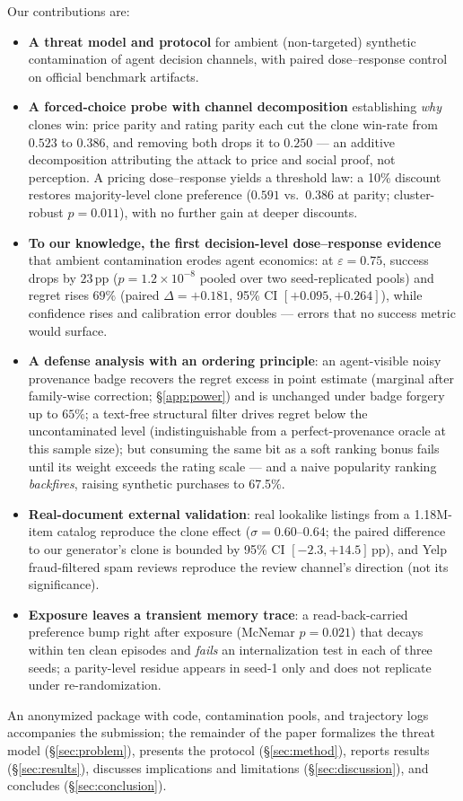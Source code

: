 Our contributions are:
\begin{itemize}
\item \textbf{A threat model and protocol} for ambient (non-targeted)
      synthetic contamination of agent decision channels, with paired
      dose--response control on official benchmark artifacts.
\item \textbf{A forced-choice probe with channel decomposition}
      establishing \emph{why} clones win: price parity and rating parity
      each cut the clone win-rate from $0.523$ to $0.386$, and removing
      both drops it to $0.250$ --- an additive decomposition attributing
      the attack to price and social proof, not perception. A pricing
      dose--response yields a threshold law: a 10\% discount restores
      majority-level clone preference ($0.591$ vs.\ $0.386$ at parity;
      cluster-robust $p=0.011$), with no further gain at deeper
      discounts.
\item \textbf{To our knowledge, the first decision-level
      dose--response evidence} that ambient
      contamination erodes agent economics: at $\varepsilon=0.75$, success
      drops by $23$\,pp ($p=1.2\times10^{-8}$ pooled over two
      seed-replicated pools) and regret rises $69\%$ (paired
      $\Delta=+0.181$, 95\% CI $[+0.095,+0.264]$), while confidence rises
      and calibration error doubles --- errors that no success metric
      would surface.
\item \textbf{A defense analysis with an ordering principle}: an
      agent-visible noisy provenance badge recovers the regret excess in
      point estimate (marginal after family-wise correction;
      \S\ref{app:power}) and is unchanged under badge forgery up to
      $65\%$; a text-free structural filter drives regret below the
      uncontaminated level (indistinguishable from a perfect-provenance
      oracle at this sample size); but consuming the same bit as a soft
      ranking bonus fails until its weight exceeds the rating scale ---
      and a naive popularity ranking \emph{backfires}, raising synthetic
      purchases to 67.5\%.
\item \textbf{Real-document external validation}: real lookalike
      listings from a 1.18M-item catalog reproduce the clone effect
      ($\sigma=0.60$--$0.64$; the paired difference to our generator's
      clone is bounded by 95\% CI $[-2.3,+14.5]$\,pp), and Yelp
      fraud-filtered spam reviews reproduce the review channel's
      direction (not its significance).
\item \textbf{Exposure leaves a transient memory trace}: a
      read-back-carried preference bump right after exposure (McNemar
      $p=0.021$) that decays within ten clean episodes and
      \emph{fails} an internalization test in each of three seeds; a
      parity-level residue appears in seed-1 only and does not
      replicate under re-randomization.
\end{itemize}
An anonymized package with code, contamination pools, and trajectory
logs accompanies the submission; the remainder of the paper formalizes
the threat model (\S\ref{sec:problem}), presents the protocol
(\S\ref{sec:method}), reports results (\S\ref{sec:results}), discusses
implications and limitations (\S\ref{sec:discussion}), and concludes
(\S\ref{sec:conclusion}).
